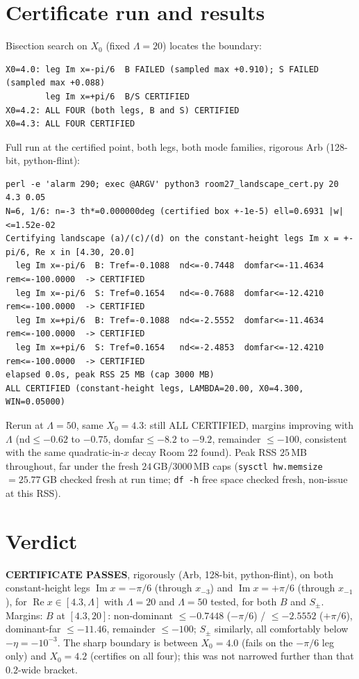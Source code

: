 \documentclass[11pt]{article}
\begin{document}
\section{Certificate run and results}
Bisection search on $X_0$ (fixed $\Lambda=20$) locates the boundary:
\begin{verbatim}
X0=4.0: leg Im x=-pi/6  B FAILED (sampled max +0.910); S FAILED (sampled max +0.088)
        leg Im x=+pi/6  B/S CERTIFIED
X0=4.2: ALL FOUR (both legs, B and S) CERTIFIED
X0=4.3: ALL FOUR CERTIFIED
\end{verbatim}
Full run at the certified point, both legs, both mode families, rigorous Arb (128-bit, python-flint):
\begin{verbatim}
perl -e 'alarm 290; exec @ARGV' python3 room27_landscape_cert.py 20 4.3 0.05
N=6, 1/6: n=-3 th*=0.000000deg (certified box +-1e-5) ell=0.6931 |w|<=1.52e-02
Certifying landscape (a)/(c)/(d) on the constant-height legs Im x = +-pi/6, Re x in [4.30, 20.0]
  leg Im x=-pi/6  B: Tref=-0.1088  nd<=-0.7448  domfar<=-11.4634  rem<=-100.0000  -> CERTIFIED
  leg Im x=-pi/6  S: Tref=0.1654   nd<=-0.7688  domfar<=-12.4210  rem<=-100.0000  -> CERTIFIED
  leg Im x=+pi/6  B: Tref=-0.1088  nd<=-2.5552  domfar<=-11.4634  rem<=-100.0000  -> CERTIFIED
  leg Im x=+pi/6  S: Tref=0.1654   nd<=-2.4853  domfar<=-12.4210  rem<=-100.0000  -> CERTIFIED
elapsed 0.0s, peak RSS 25 MB (cap 3000 MB)
ALL CERTIFIED (constant-height legs, LAMBDA=20.00, X0=4.300, WIN=0.05000)
\end{verbatim}
Rerun at $\Lambda=50$, same $X_0=4.3$: still ALL CERTIFIED, margins improving with $\Lambda$
($\mathrm{nd}\le-0.62$ to $-0.75$, $\mathrm{domfar}\le-8.2$ to $-9.2$, remainder $\le-100$, consistent with
the same quadratic-in-$x$ decay Room 22 found). Peak RSS $25$\,MB throughout, far under the fresh
$24$\,GB/$3000$\,MB caps (\texttt{sysctl hw.memsize}$=25.77$\,GB checked fresh at run time; \texttt{df -h}
free space checked fresh, non-issue at this RSS).

\section*{Verdict}
\textbf{CERTIFICATE PASSES}, rigorously (Arb, 128-bit, python-flint), on both constant-height legs
$\operatorname{Im}x=-\pi/6$ (through $x_{-3}$) and $\operatorname{Im}x=+\pi/6$ (through $x_{-1}$), for
$\operatorname{Re}x\in[4.3,\Lambda]$ with $\Lambda=20$ and $\Lambda=50$ tested, for both $B$ and $S_\pm$.
Margins: $B$ at $[4.3,20]$: non-dominant $\le-0.7448$ ($-\pi/6$) / $\le-2.5552$ ($+\pi/6$), dominant-far
$\le-11.46$, remainder $\le-100$; $S_\pm$ similarly, all comfortably below $-\eta=-10^{-3}$. The sharp
boundary is between $X_0=4.0$ (fails on the $-\pi/6$ leg only) and $X_0=4.2$ (certifies on all four); this
was not narrowed further than that $0.2$-wide bracket.
\end{document}
